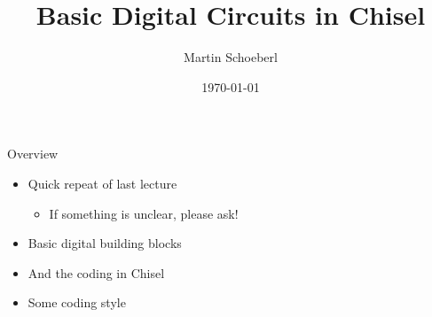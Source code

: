 

\newif\ifbook



\title{Basic Digital Circuits in Chisel}
\author{Martin Schoeberl}
\date{\today}



\begin{frame}
\titlepage
\end{frame}


\begin{frame}[fragile]{Overview}
\begin{itemize}
\item Quick repeat of last lecture
\begin{itemize}
\item If something is unclear, please ask!
\end{itemize}
\item Basic digital building blocks
\item And the coding in Chisel
\item Some coding style
\end{itemize}
\end{frame}

